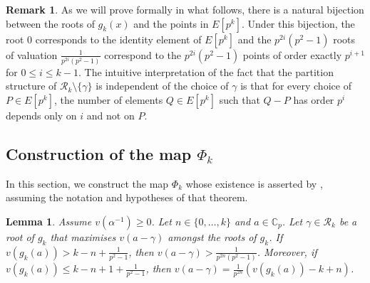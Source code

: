 \documentclass{amsart}
\newtheorem{lemma}[theorem]{Lemma}
\theoremstyle{definition}
\newtheorem{remark}[theorem]{Remark}
\newcommand{\C}{\mathbb{C}}
\numberwithin{theorem}{section}
\numberwithin{equation}{section}
\begin{document}
\begin{remark}\label{rmk: bijection is sensible}
As we will prove formally in what follows, there is a natural bijection between the roots of $g_k(x)$ and the points in $E[p^k]$.
Under this bijection, the root $0$ corresponds to the identity element of $E[p^k]$ and the $p^{2i}(p^2-1)$ roots of valuation $\frac{1}{p^{2i}(p^2-1)}$ correspond to the $p^{2i}(p^2-1)$ points of order exactly $p^{i+1}$ for $0 \leq i \leq k-1$. The intuitive interpretation of the fact that the partition structure of $\mathcal{R}_k \setminus \{\gamma\}$ is independent of the choice of $\gamma$ is that for every choice of $P \in E[p^k]$, the number of elements $Q \in E[p^k]$ such that $Q-P$ has order $p^i$ depends only on $i$ and not on $P$.
\end{remark}


\subsection{Construction of the map $\Phi_k$}\label{sect: construction of Phik}
In this section, we construct the map $\Phi_k$ whose existence is asserted by , assuming the notation and hypotheses of that theorem. 

\begin{lemma}\label{lemma: roots distance}
    Assume $v(\alpha^{-1}) \geq 0$. Let $n \in \{0, \dots , k\}$ and $a \in \C_p$. Let $\gamma \in \mathcal{R}_k$ be a root of $g_k$ that maximises $v(a-\gamma)$ amongst the roots of $g_k$.
    If $v(g_k(a)) > k-n+\frac{1}{p^2-1}$, then $v(a-\gamma)> \frac{1}{p^{2n}(p^2-1)}$. Moreover, if $v(g_k(a)) \le k-n+1 + \frac{1}{p^2-1}$, then $v(a-\gamma) = \frac{1}{p^{2n}}(v(g_k(a)) - k+n)$. 
\end{lemma}
\end{document}
